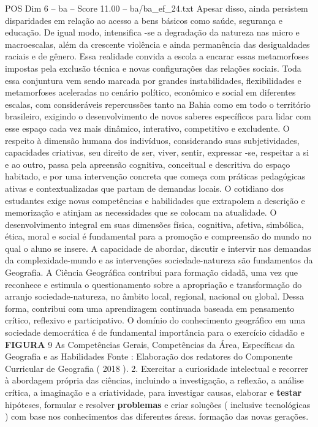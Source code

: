\begin{textsample}{POS Dim 6 – ba – Score 11.00 – ba/ba\_ef\_24.txt}
Apesar disso, ainda persistem disparidades em relação ao acesso a bens básicos como saúde, segurança e educação.
De igual modo, intensifica -se a degradação da natureza nas micro e macroescalas, além da crescente violência e ainda permanência das desigualdades raciais e de gênero.
Essa realidade convida a escola a encarar essas metamorfoses impostas pela exclusão técnica e novas configurações das relações sociais.
Toda essa conjuntura vem sendo marcada por grandes instabilidades, flexibilidades e metamorfoses aceleradas no cenário político, econômico e social em diferentes escalas, com consideráveis repercussões tanto na Bahia como em todo o território brasileiro, exigindo o desenvolvimento de novos saberes específicos para lidar com esse espaço cada vez mais dinâmico, interativo, competitivo e excludente.
O respeito à dimensão humana dos indivíduos, considerando suas subjetividades, capacidades criativas, seu direito de ser, viver, sentir, expressar -se, respeitar a si e ao outro, passa pela apreensão cognitiva, conceitual e descritiva do espaço habitado, e por uma intervenção concreta que começa com práticas pedagógicas ativas e contextualizadas que partam de demandas locais.
O cotidiano dos estudantes exige novas competências e habilidades que extrapolem a descrição e memorização e atinjam as necessidades que se colocam na atualidade.
O desenvolvimento integral em suas dimensões física, cognitiva, afetiva, simbólica, ética, moral e social é fundamental para a promoção e compreensão do mundo no qual o aluno se insere.
A capacidade de abordar, discutir e intervir nas demandas da complexidade-mundo e as intervenções sociedade-natureza são fundamentos da Geografia.
A Ciência Geográfica contribui para formação cidadã, uma vez que reconhece e estimula o questionamento sobre a apropriação e transformação do arranjo sociedade-natureza, no âmbito local, regional, nacional ou global.
Dessa forma, contribui com uma aprendizagem continuada baseada em pensamento crítico, reflexivo e participativo.
O domínio do conhecimento geográfico em uma sociedade democrática é de fundamental importância para o exercício cidadão e \textbf{FIGURA} 9 As Competências Gerais, Competências da Área, Específicas da Geografia e as Habilidades Fonte : Elaboração dos redatores do Componente Curricular de Geografia ( 2018 ). 2.
Exercitar a curiosidade intelectual e recorrer à abordagem própria das ciências, incluindo a investigação, a reflexão, a análise crítica, a imaginação e a criatividade, para investigar causas, elaborar e \textbf{testar} hipóteses, formular e resolver \textbf{problemas} e criar soluções ( inclusive tecnológicas ) com base nos conhecimentos das diferentes áreas. formação das novas gerações.

\end{textsample}
